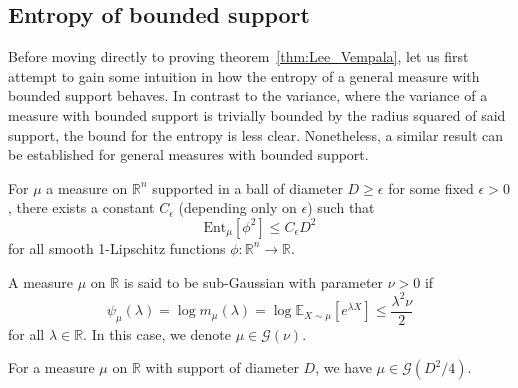 
\subsection{Entropy of bounded support}

Before moving directly to proving theorem~\ref{thm:Lee_Vempala}, let us first attempt to gain some intuition 
in how the entropy of a general measure with bounded support behaves. In contrast to the variance, 
where the variance of a measure with bounded support is trivially bounded by the radius squared of 
said support, the bound for the entropy is less clear. Nonetheless, a similar result can be established 
for general measures with bounded support.


\begin{lemma}\label{lem:entropy_supp2}
  For \(\mu\) a measure on \(\mathbb{R}^n\) supported in a ball of diameter \(D \ge \epsilon\) for some fixed \(\epsilon > 0\), 
  there exists a constant \(C_\epsilon\) (depending only on \(\epsilon\)) such that 
  \[\text{Ent}_\mu[\phi^2] \le C_\epsilon D^2\]
  for all smooth 1-Lipschitz functions \(\phi : \mathbb{R}^n \to \mathbb{R}\).
\end{lemma}

\begin{definition}
  A measure \(\mu\) on \(\mathbb{R}\) is said to be sub-Gaussian with parameter \(\nu > 0\) if 
  \[\psi_\mu(\lambda) = \log m_{\mu}(\lambda) = \log \mathbb{E}_{X \sim \mu}[e^{\lambda X}] \le \frac{\lambda^2\nu}{2}\]
  for all \(\lambda \in \mathbb{R}\). In this case, we denote \(\mu \in \mathcal{G}(\nu)\).
\end{definition}

\begin{lemma}
  For a measure \(\mu\) on \(\mathbb{R}\) with support of diameter \(D\), we have \(\mu \in \mathcal{G}(D^2 / 4)\).
\end{lemma}

